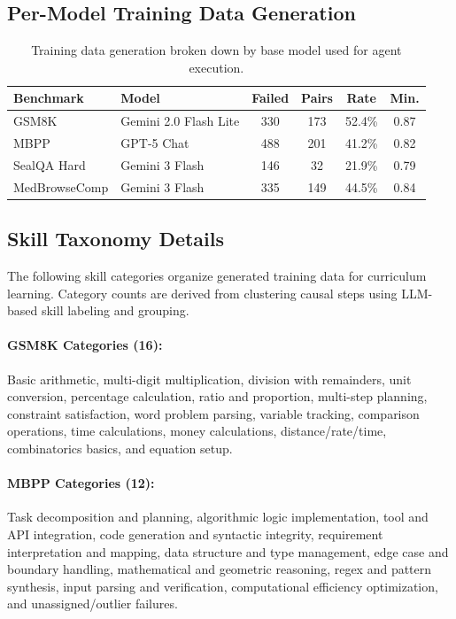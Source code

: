 \documentclass{article}
\theoremstyle{plain}
\theoremstyle{definition}
\theoremstyle{remark}
\begin{document}
\subsection{Per-Model Training Data Generation}

\begin{table}[h]
  \caption{Training data generation broken down by base model used for agent execution.}
  \centering
  \begin{small}
    \begin{tabular}{llcccc}
      \toprule
      Benchmark & Model & Failed & Pairs & Rate & Min. \\
      \midrule
      GSM8K & Gemini 2.0 Flash Lite & 330 & 173 & 52.4\% & 0.87 \\
      MBPP & GPT-5 Chat & 488 & 201 & 41.2\% & 0.82 \\
      SealQA Hard & Gemini 3 Flash & 146 & 32 & 21.9\% & 0.79 \\
      MedBrowseComp & Gemini 3 Flash & 335 & 149 & 44.5\% & 0.84 \\
      \bottomrule
    \end{tabular}
  \end{small}
\end{table}

\subsection{Skill Taxonomy Details}

The following skill categories organize generated training data for curriculum learning. Category counts are derived from clustering causal steps using LLM-based skill labeling and grouping.

\paragraph{GSM8K Categories (16):}
Basic arithmetic, multi-digit multiplication, division with remainders, unit conversion, percentage calculation, ratio and proportion, multi-step planning, constraint satisfaction, word problem parsing, variable tracking, comparison operations, time calculations, money calculations, distance/rate/time, combinatorics basics, and equation setup.

\paragraph{MBPP Categories (12):}
Task decomposition and planning, algorithmic logic implementation, tool and API integration, code generation and syntactic integrity, requirement interpretation and mapping, data structure and type management, edge case and boundary handling, mathematical and geometric reasoning, regex and pattern synthesis, input parsing and verification, computational efficiency optimization, and unassigned/outlier failures.
\end{document}
